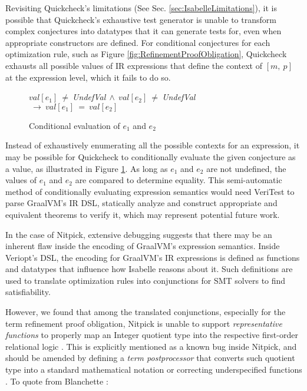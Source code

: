 Revisiting Quickcheck's limitations (See Sec. \ref{sec:IsabelleLimitations}), it is possible that Quickcheck's exhaustive test generator 
is unable to transform complex conjectures into datatypes that it can generate tests for, even when appropriate constructors are defined. 
For conditional conjectures for each optimization rule, such as Figure \ref{fig:RefinementProofObligation}, Quickcheck exhausts all 
possible values of IR expressions that define the context of \([m,~p]\) at the expression level, which it fails to do so.

\begin{figure}[!htb]
    \centering
    \(val[e_1]~\neq~\)\emph{UndefVal}\(~\land~val[e_2]~\neq~\)\emph{UndefVal}\(~\longrightarrow~val[e_1]~=~val[e_2]\)

    \caption{Conditional evaluation of \(e_1\) and \(e_2\)}
    \label{fig:ConditionalEvaluation}
\end{figure}

Instead of exhaustively enumerating all the possible contexts for an expression, it may be possible for Quickcheck to conditionally evaluate 
the given conjecture as a value, as illustrated in Figure \ref{fig:ConditionalEvaluation}. As long as \(e_1\) and \(e_2\) are not undefined, 
the values of \(e_1\) and \(e_2\) are compared to determine equality. This semi-automatic method of conditionally evaluating expression 
semantics would need VeriTest to parse GraalVM's IR DSL, statically analyze and construct appropriate and equivalent 
theorems to verify it, which may represent potential future work.

In the case of Nitpick, extensive debugging suggests that there may be an inherent flaw inside the encoding of GraalVM's expression semantics.
Inside Veriopt's DSL, the encoding for GraalVM's IR expressions is defined as functions and datatypes that influence how Isabelle 
reasons about it. Such definitions are used to translate optimization rules into conjunctions for SMT solvers to find satisfiability.

However, we found that among the translated conjunctions, especially for the term refinement proof obligation, 
Nitpick is unable to support \emph{representative functions} to properly map an Integer quotient type \cite[Sec. 3.7]{isabelleNitpick} 
into the respective first-order relational logic \cite[Ch. 8]{isabelleNitpick}. This is explicitly mentioned as a known bug inside Nitpick, 
and should be amended by defining a \emph{term postprocessor} that converts such quotient type into a standard mathematical notation 
\cite[Sec. 3.7]{isabelleNitpick} or correcting underspecified functions \cite[Ch. 8]{isabelleNitpick}. 
To quote from Blanchette \cite[Ch. 8]{isabelleNitpick}:

